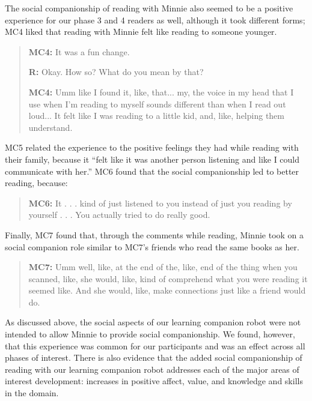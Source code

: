 \documentclass{sigchi}
\begin{document}
The social companionship of reading with Minnie also seemed to be a positive experience for our phase 3 and 4 readers as well, although it took different forms; MC4 liked that reading with Minnie felt like reading to someone younger.
 
 \begin{quote}
 	 \textbf{MC4:} It was a fun change. 
 	 
 	 \textbf{R:} Okay. How so? What do you mean by that?
 	 
 	 \textbf{MC4:} Umm like I found it, like, that... my, the voice in my head that I use when I'm reading to myself sounds different than when I read out loud... It felt like I was reading to a little kid, and, like, helping them understand.
 	 \end{quote}
 	 
MC5 related the experience to the positive feelings they had while reading with their family, because it ``felt like it was another person listening and like I could communicate with her.'' MC6 found that the social companionship led to better reading, because:

	\begin{quote} 	
		 \textbf{MC6:} It . . . kind of just listened to you instead of just you reading by yourself . . . You actually tried to do really good.
	\end{quote}
 
 Finally, MC7 found that, through the comments while reading, Minnie took on a social companion role similar to MC7's friends who read the same books as her.
 
	 \begin{quote}
	 	 \textbf{MC7:} Umm well, like, at the end of the, like, end of the thing when you scanned, like, she would, like, kind of comprehend what you were reading it seemed like. And she would, like, make connections just like a friend would do. 
	 \end{quote}
 
As discussed above, the social aspects of our learning companion robot were not intended to allow Minnie to provide social companionship. We found, however, that this experience was common for our participants and was an effect across all phases of interest. There is also evidence that the added social companionship of reading with our learning companion robot addresses each of the major areas of interest development: increases in positive affect, value, and knowledge and skills in the domain.

\end{document}
